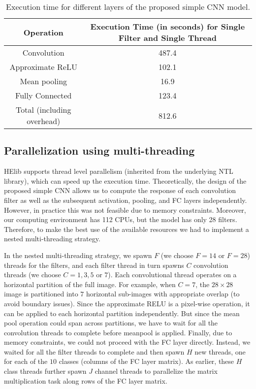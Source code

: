 \documentclass[letterpaper]{article} %
\begin{document}
\begin{table*}[t]
\centering
\begin{center}
\begin{tabular}{|c|c|}
\hline
Operation   &  Execution Time (in seconds) for Single Filter and Single Thread\\
\hline
Convolution & 487.4 \\
\hline
Approximate ReLU & 102.1 \\
\hline
Mean pooling & 16.9 \\
\hline
Fully Connected & 123.4 \\
\hline
Total (including overhead) & 812.6 \\
\hline
\end{tabular}
\end{center}
\caption{Execution time for different layers of the proposed simple CNN model.}
\label{execution_time}
\end{table*}

\subsection{Parallelization using multi-threading}

HElib supports thread level parallelism (inherited from the underlying NTL library), which can speed up the execution time. Theoretically, the design of the proposed simple CNN allows us to compute the response of each convolution filter as well as the subsequent activation, pooling, and FC layers independently. However, in practice this was not feasible due to memory constraints. Moreover, our computing environment has 112 CPUs, but the model has only 28 filters. Therefore, to make the best use of the available resources we had to implement a nested multi-threading strategy.

In the nested multi-threading strategy, we spawn $F$ (we choose $F=14$ or $F=28$) threads for the filters, and each filter thread in turn spawns $C$ convolution threads (we choose $C=1,3,5$ or $7$). Each convolutional thread operates on a horizontal partition of the full image. For example, when $C=7$, the $28 \times 28$ image is partitioned into $7$ horizontal sub-images with appropriate overlap (to avoid boundary issues). Since the approximate RELU is a pixel-wise operation, it can be applied to each horizontal partition independently. But since the mean pool operation could span across partitions, we have to wait for all the convolution threads to complete before meanpool is applied. Finally, due to memory constraints, we could not proceed with the FC layer directly. Instead, we waited for all the filter threads to complete and then spawn $H$ new threads, one for each of the $10$ classes (columns of the FC layer matrix). As earlier, these $H$ class threads further spawn $J$ channel threads to parallelize the matrix multiplication task along rows of the FC layer matrix.
\end{document}
